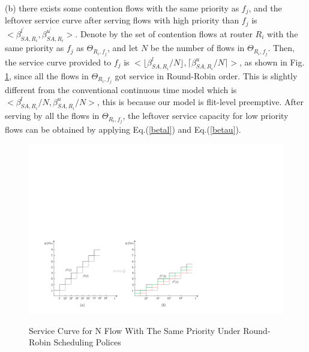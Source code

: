 \documentclass[10pt,journal]{IEEEtran}
\begin{document}
(b) there exists some contention flows with the same priority as $f_j$, and the leftover service curve after serving flows with high priority than $f_j$ is $<\beta_{SA,R_i}^{l^\prime},\beta_{SA,R_i}^{u^\prime}>$. Denote by the set of contention flows at router $R_i$ with the same priority as $f_j$ as $\Theta_{R_i,f_j}$, and let $N$ be the number of flows in $\Theta_{R_i,f_j}$. Then, the service curve provided to $f_j$ is $<\lfloor\beta^l_{SA,R_i}/N\rfloor,\lceil\beta^u_{SA,R_i}/N\rceil>$, as shown in Fig. \ref{roundrobin}, since all the flows in $\Theta_{R_i,f_j}$ got service in Round-Robin order. This is slightly different from the conventional continuous time model which is $<\beta^l_{SA,R_i}/N,\beta^u_{SA,R_i}/N>$, this is because our model is flit-level preemptive. After serving by all the flows in $\Theta_{R_i,f_j}$, the leftover service capacity for low priority flows can be obtained by applying Eq.(\ref{betal}) and Eq.(\ref{betau}).
\begin{figure}
  \centering
  \includegraphics[scale=0.5]{figures/RoundRobin.pdf}\\
  \caption{Service Curve for N Flow With The Same Priority Under Round-Robin Scheduling Polices}\label{roundrobin}
\end{figure}
\end{document}
